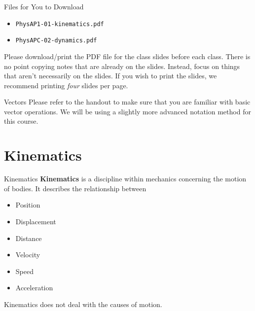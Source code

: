 \documentclass[12pt,compress,aspectratio=169]{beamer}
\begin{document}
\begin{frame}
  \titlepage
\end{frame}



\begin{frame}{Files for You to Download}
  \begin{itemize}
  \item\texttt{PhysAP1-01-kinematics.pdf}
  \item\texttt{PhysAPC-02-dynamics.pdf}
  \end{itemize}
  
  \vspace{.1in}Please download/print the PDF file for the class slides before
  each class. There is no point copying notes that are already on the slides.
  Instead, focus on things that aren't necessarily on the slides. If you wish
  to print the slides, we recommend printing \emph{four} slides per page.
\end{frame}



\begin{frame}{Vectors}
  Please refer to the handout to make sure that you are familiar with basic
  vector operations. We will be using a slightly more advanced notation method
  for this course.
\end{frame}



\section{Kinematics}

\begin{frame}{Kinematics}
  \textbf{Kinematics} is a discipline within mechanics concerning the
  motion of bodies. It describes the relationship between 
  \begin{itemize}
  \item<alert@1> Position
  \item<alert@1> Displacement
  \item Distance 
  \item<alert@1> Velocity
  \item Speed
  \item<alert@1> Acceleration
  \end{itemize}
  Kinematics does not deal with the causes of motion.
\end{frame}
\end{document}
